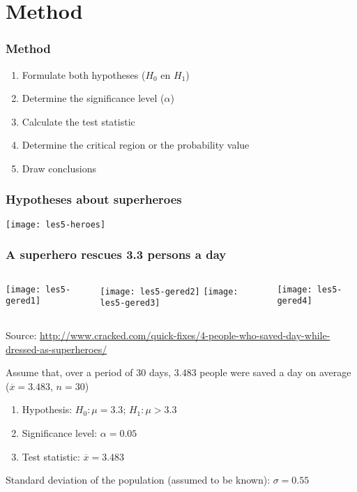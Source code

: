 \documentclass[aspectratio=169]{beamer}
\begin{document}
\section{Method}

\begin{frame}
  \frametitle{Method}
  
  \begin{enumerate}
    \item Formulate both hypotheses ($H_0$ en $H_1$)
    \item Determine the significance level ($\alpha$)
    \item Calculate the test statistic
    \item Determine the critical region or the probability value
    \item Draw conclusions
  \end{enumerate}
\end{frame}

\begin{frame}[plain]
  \frametitle{Hypotheses about superheroes}
  \centering
  \texttt{[image: les5-heroes]}
\end{frame}

\begin{frame}
  \frametitle{A superhero rescues 3.3 persons a day}
  
  \begin{columns}
    \centering
    \texttt{[image: les5-gered1]}
    
    \texttt{[image: les5-gered2]}
    \centering
    \texttt{[image: les5-gered3]}
    
    \texttt{[image: les5-gered4]}
  \end{columns}
  
  \vfill
  \centering
  \small{Source: \url{http://www.cracked.com/quick-fixes/4-people-who-saved-day-while-dressed-as-superheroes/}}
\end{frame}

\begin{frame}
  Assume that, over a period of 30 days, $3.483$ people were saved a day on average ($\overline{x}=3.483$, $n=30$)
  \vfill
  \begin{enumerate}
    \item Hypothesis: $H_0: \mu = 3.3$; $H_1: \mu > 3.3$
    \item Significance level: $\alpha = 0.05$
    \item Test statistic: $\overline{x} = 3.483$
  \end{enumerate}
  \vfill
  Standard deviation of the population (assumed to be known): $\sigma = 0.55$
\end{frame}
\end{document}
